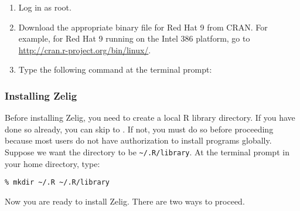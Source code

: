 \begin{enumerate}

\item Log in as root.

\item Download the appropriate binary file for Red Hat 9 from CRAN.
  For example, for Red Hat 9 running on the Intel 386 platform, go to
  \url{http://cran.r-project.org/bin/linux/}. 

\item Type the following command at the terminal prompt:

\end{enumerate}

\subsubsection{Installing Zelig}\label{sss:unix.library}

Before installing Zelig, you need to create a local R library
directory. If you have done so already, you can skip to
. If not, you must do so before proceeding because
most users do not have authorization to install programs globally.
Suppose we want the directory to be {\tt \~{}/.R/library}.  At the
terminal prompt in your home directory, type:
\begin{verbatim}
% mkdir ~/.R ~/.R/library
\end{verbatim}
Now you are ready to install Zelig.\label{unix.zelig} There are two
ways to proceed.

